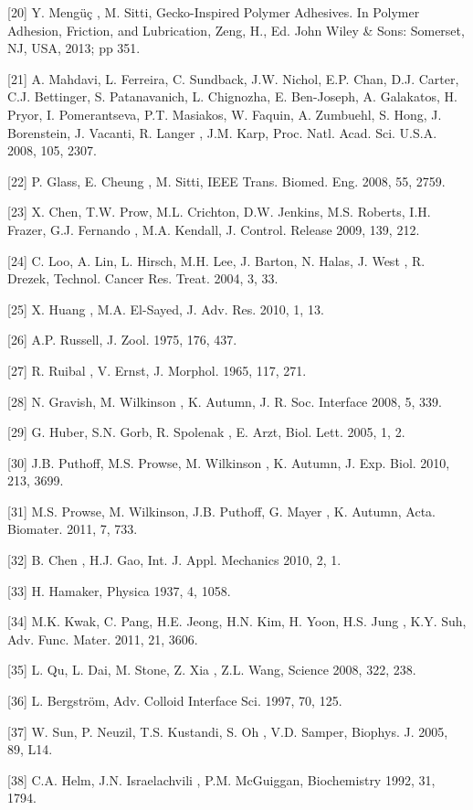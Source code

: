 [20]	Y. Mengüç , M. Sitti, Gecko-Inspired Polymer Adhesives. In Polymer Adhesion, Friction, and Lubrication, Zeng, H., Ed. John Wiley \& Sons: Somerset, NJ, USA, 2013; pp 351.

[21]	A. Mahdavi, L. Ferreira, C. Sundback, J.W. Nichol, E.P. Chan, D.J. Carter, C.J. Bettinger, S. Patanavanich, L. Chignozha, E. Ben-Joseph, A. Galakatos, H. Pryor, I. Pomerantseva, P.T. Masiakos, W. Faquin, A. Zumbuehl, S. Hong, J. Borenstein, J. Vacanti, R. Langer , J.M. Karp, Proc. Natl. Acad. Sci. U.S.A. 2008, 105, 2307.

[22]	P. Glass, E. Cheung , M. Sitti, IEEE Trans. Biomed. Eng. 2008, 55, 2759.

[23]	X. Chen, T.W. Prow, M.L. Crichton, D.W. Jenkins, M.S. Roberts, I.H. Frazer, G.J. Fernando , M.A. Kendall, J. Control. Release 2009, 139, 212.

[24]	C. Loo, A. Lin, L. Hirsch, M.H. Lee, J. Barton, N. Halas, J. West , R. Drezek, Technol. Cancer Res. Treat. 2004, 3, 33.

[25]	X. Huang , M.A. El-Sayed, J. Adv. Res. 2010, 1, 13.

[26]	A.P. Russell, J. Zool. 1975, 176, 437.

[27]	R. Ruibal , V. Ernst, J. Morphol. 1965, 117, 271.

[28]	N. Gravish, M. Wilkinson , K. Autumn, J. R. Soc. Interface 2008, 5, 339.

[29]	G. Huber, S.N. Gorb, R. Spolenak , E. Arzt, Biol. Lett. 2005, 1, 2.

[30]	J.B. Puthoff, M.S. Prowse, M. Wilkinson , K. Autumn, J. Exp. Biol. 2010, 213, 3699.

[31]	M.S. Prowse, M. Wilkinson, J.B. Puthoff, G. Mayer , K. Autumn, Acta. Biomater. 2011, 7, 733.

[32]	B. Chen , H.J. Gao, Int. J. Appl. Mechanics 2010, 2, 1.

[33]	H. Hamaker, Physica 1937, 4, 1058.

[34]	M.K. Kwak, C. Pang, H.E. Jeong, H.N. Kim, H. Yoon, H.S. Jung , K.Y. Suh, Adv. Func. Mater. 2011, 21, 3606.

[35]	L. Qu, L. Dai, M. Stone, Z. Xia , Z.L. Wang, Science 2008, 322, 238.

[36]	L. Bergström, Adv. Colloid Interface Sci. 1997, 70, 125.

[37]	W. Sun, P. Neuzil, T.S. Kustandi, S. Oh , V.D. Samper, Biophys. J. 2005, 89, L14.

[38]	C.A. Helm, J.N. Israelachvili , P.M. McGuiggan, Biochemistry 1992, 31, 1794.

